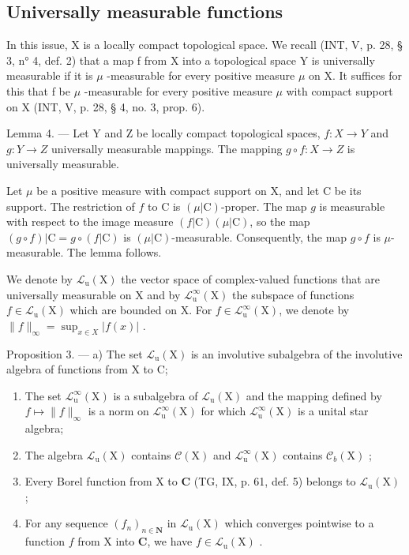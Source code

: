 \subsection{Universally measurable functions}

In this issue, X is a locally compact topological space. We recall (INT, V, p. 28, § 3, n° 4, def. 2) that a map f from X into a topological space Y is universally measurable if it is \(\mu\) -measurable for every positive measure \(\mu\) on X. It suffices for this that f be \(\mu\) -measurable for every positive measure \(\mu\) with compact support on X (INT, V, p. 28, § 4, no. 3, prop. 6).

Lemma 4. --- Let Y and Z be locally compact topological spaces, \(f\colon X\to Y\) and \(g\colon Y\to Z\) universally measurable mappings. The mapping \(g\circ f\colon X\to Z\) is universally measurable.

Let \(\mu\) be a positive measure with compact support on X, and let C be its support. The restriction of \(f\) to C is \((\mu|\mathrm{C})\)-proper. The map \(g\) is measurable with respect to the image measure \((f|\mathrm{C})(\mu|\mathrm{C})\), so the map \((g \circ f)|\mathrm{C} = g \circ (f|\mathrm{C})\) is \((\mu|\mathrm{C})\)-measurable. Consequently, the map \(g \circ f\) is \(\mu\)-measurable. The lemma follows.

We denote by \(\mathcal{L}_{\mathrm{u}}(\mathrm{X})\) the vector space of complex-valued functions that are universally measurable on X and by \(\mathcal{L}_{\mathrm{u}}^{\infty}(\mathrm{X})\) the subspace of functions \(f \in \mathcal{L}_{\mathrm{u}}(\mathrm{X})\) which are bounded on X. For \(f \in \mathcal{L}_{\mathrm{u}}^{\infty}(\mathrm{X})\), we denote by \(\|f\|_{\infty} = \sup_{x \in X} |f(x)|\) .

Proposition 3. --- a) The set \(\mathcal{L}_{\mathrm{u}}(\mathrm{X})\) is an involutive subalgebra of the involutive algebra of functions from X to C;

\begin{enumerate}
\def\labelenumi{\alph{enumi})}
\setcounter{enumi}{1}
\item
  The set \(\mathcal{L}_{\mathrm{u}}^{\infty}(\mathrm{X})\) is a subalgebra of \(\mathcal{L}_{\mathrm{u}}(\mathrm{X})\) and the mapping defined by \(f\mapsto \| f\|_{\infty}\) is a norm on \(\mathcal{L}_{\mathrm{u}}^{\infty}(\mathrm{X})\) for which \(\mathcal{L}_{\mathrm{u}}^{\infty}(\mathrm{X})\) is a unital star algebra;
\item
  The algebra \(\mathcal{L}_{\mathrm{u}}(\mathrm{X})\) contains \(\mathcal{C}(\mathrm{X})\) and \(\mathcal{L}_{\mathrm{u}}^{\infty}(\mathrm{X})\) contains \(\mathcal{C}_b(\mathrm{X})\) ;
\item
  Every Borel function from X to \(\mathbf{C}\) (TG, IX, p. 61, def. 5) belongs to \(\mathcal{L}_{\mathrm{u}}(\mathrm{X})\) ;
\item
  For any sequence \((f_n)_{n\in \mathbf{N}}\) in \(\mathcal{L}_{\mathrm{u}}(\mathrm{X})\) which converges pointwise to a function \(f\) from X into \(\mathbf{C}\), we have \(f\in \mathcal{L}_{\mathrm{u}}(\mathrm{X})\) .
\end{enumerate}

